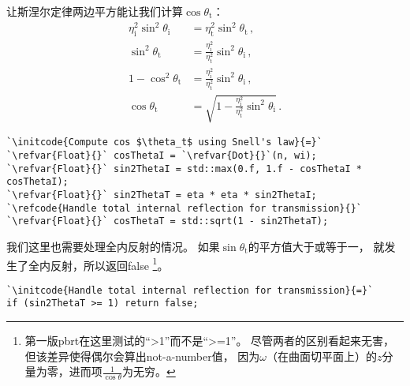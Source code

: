 让斯涅尔定律两边平方能让我们计算$\cos\theta_{\mathrm{t}}$：
\begin{align*}
    \eta_{\mathrm{i}}^2\sin^2\theta_{\mathrm{i}} & =\eta_{\mathrm{t}}^2\sin^2\theta_{\mathrm{t}}\, ,                                      \\
    \sin^2\theta_{\mathrm{t}}                    & =\frac{\eta_{\mathrm{i}}^2}{\eta_{\mathrm{t}}^2}\sin^2\theta_{\mathrm{i}}\, ,          \\
    1-\cos^2\theta_{\mathrm{t}}                  & =\frac{\eta_{\mathrm{i}}^2}{\eta_{\mathrm{t}}^2}\sin^2\theta_{\mathrm{i}}\, ,          \\
    \cos\theta_{\mathrm{t}}                      & =\sqrt{1-\frac{\eta_{\mathrm{i}}^2}{\eta_{\mathrm{t}}^2}\sin^2\theta_{\mathrm{i}}}\, .
\end{align*}

\begin{lstlisting}
`\initcode{Compute cos $\theta_t$ using Snell's law}{=}`
`\refvar{Float}{}` cosThetaI = `\refvar{Dot}{}`(n, wi);
`\refvar{Float}{}` sin2ThetaI = std::max(0.f, 1.f - cosThetaI * cosThetaI);
`\refvar{Float}{}` sin2ThetaT = eta * eta * sin2ThetaI;
`\refcode{Handle total internal reflection for transmission}{}`
`\refvar{Float}{}` cosThetaT = std::sqrt(1 - sin2ThetaT);
\end{lstlisting}

我们这里也需要处理全内反射的情况。
如果$\sin\theta_{\mathrm{t}}$的平方值大于或等于一，
就发生了全内反射，所以返回{\ttfamily false}
\footnote{第一版pbrt在这里测试的“>1”而不是“>=1”。
    尽管两者的区别看起来无害，但该差异使得偶尔会算出not-a-number值，
    因为$\omega$（在曲面切平面上）的$z$分量为零，进而项$\frac{1}{\cos\theta}$为无穷。}。
\begin{lstlisting}
`\initcode{Handle total internal reflection for transmission}{=}`
if (sin2ThetaT >= 1) return false;
\end{lstlisting}

